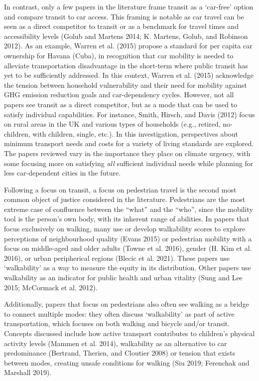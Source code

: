 \documentclass[12pt, oneside]{report}
\begin{document}
In contrast, only a few papers in the literature frame transit as a
`car-free' option and compare transit to car access. This framing is
notable as car travel can be seen as a direct competitor to transit or
as a benchmark for travel times and accessibility levels (Golub and
Martens 2014; K. Martens, Golub, and Robinson 2012). As an example,
Warren et al. (2015) propose a standard for per capita car ownership for
Havana (Cuba), in recognition that car mobility is needed to alleviate
transportation disadvantage in the short-term where public transit has
yet to be sufficiently addressed. In this context, Warren et al. (2015)
acknowledge the tension between household vulnerability and their need
for mobility against GHG emission reduction goals and car-dependency
cycles. However, not all papers see transit as a direct competitor, but
as a mode that can be used to satisfy individual capabilities. For
instance, Smith, Hirsch, and Davis (2012) focus on rural areas in the UK
and various types of households (e.g., retired, no-children, with
children, single, etc.). In this investigation, perspectives about
minimum transport needs and costs for a variety of living standards are
explored. The papers reviewed vary in the importance they place on
climate urgency, with some focusing more on satisfying \emph{all}
sufficient individual needs while planning for less car-dependent cities
in the future.

Following a focus on transit, a focus on pedestrian travel is the second
most common object of justice considered in the literature. Pedestrians
are the most extreme case of confluence between the ``what'' and the
``who'', since the mobility tool is the person's own body, with its
inherent range of abilities. In papers that focus exclusively on
walking, many use or develop walkability scores to explore perceptions
of neighbourhood quality (Evans 2015) or pedestrian mobility with a
focus on middle-aged and older adults (Towne et al. 2016), gender (H.
Kim et al. 2016), or urban peripherical regions (Blecic et al. 2021).
These papers use `walkability' as a way to measure the equity in its
distribution. Other papers use walkability as an indicator for public
health and urban vitality (Sung and Lee 2015; McCormack et al. 2012).

Additionally, papers that focus on pedestrians also often see walking as
a bridge to connect multiple modes: they often discuss `walkability' as
part of active transportation, which focuses on both walking and bicycle
and/or transit. Concepts discussed include how active transport
contributes to children's physical activity levels (Mammen et al. 2014),
walkability as an alternative to car predominance (Bertrand, Therien,
and Cloutier 2008) or tension that exists between modes, creating unsafe
conditions for walking (Siu 2019; Ferenchak and Marshall 2019).
\end{document}
